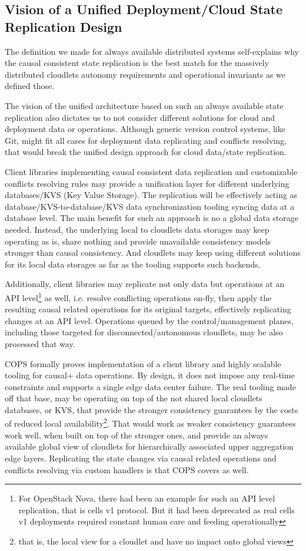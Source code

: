 \documentclass[conference]{IEEEtran}
\begin{document}
\subsection{Vision of a Unified Deployment/Cloud State Replication Design}

The definition we made for always available distributed systems self-explains
why the causal consistent state replication is the best match for the
massively distributed cloudlets autonomy requirements and operational
invariants as we defined those.

The vision of the unified architecture based on such an always available state
replication also dictates us to not consider different solutions for cloud and
deployment data or operations. Although generic version control systems, like
Git, might fit all cases for deployment data replicating and
conflicts resolving, that would break the unified design approach for cloud
data/state replication.

Client libraries implementing causal consistent data replication and
customizable conflicts resolving rules may provide a unification layer for
different underlying databases/KVS (Key Value Storage). The replication will be
effectively acting as database/KVS-to-database/KVS data synchronization tooling
syncing data at a database level. The main benefit for such an approach is no a
global data storage needed. Instead, the underlying local to cloudlets data
storages may keep operating as is, share nothing and provide unavailable
consistency models stronger than causal consistency. And cloudlets may keep
using different solutions for its local data storages as far as the tooling
supports such backends.

Additionally, client libraries may replicate not only data but operations at an
API level\footnote{For OpenStack Nova, there had been an example for such an
API level replication, that is cells v1 protocol. But it had been deprecated as
real cells v1 deployments required constant human care and feeding
operationally} as well, i.e. resolve conflicting operations on-fly, then apply
the resulting causal related operations for its original targets, effectively
replicating changes at an API level. Operations queued by the control/management planes, including
those targeted for disconnected/autonomous cloudlets, may be also processed
that way.

COPS formally proves implementation of a client library and highly scalable
tooling for causal+ data operations. By design, it does not impose any
real-time constraints and supports a single edge data center failure. The real
tooling made off that base, may be operating on top of the not shared local
cloudlets databases, or KVS, that provide the stronger consistency guarantees
by the costs of reduced local availability\footnote{that is, the local view for
a cloudlet and have no impact onto global views}. That would work as weaker
consistency guarantees work well, when built on top of the stronger ones, and
provide an always available global view of cloudlets for hierarchically
associated upper aggregation edge layers. Replicating the state changes via
causal related operations and conflicts resolving via custom handlers is that
COPS covers as well.
\end{document}
